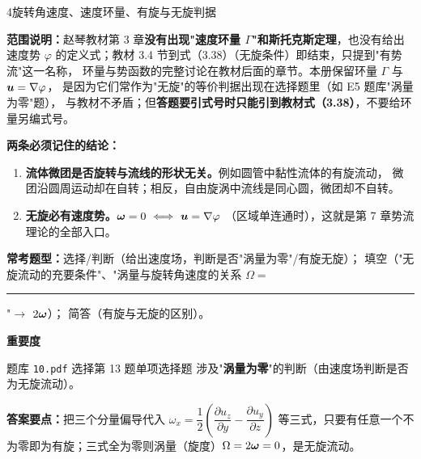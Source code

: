 \begin{kaodian}{4}{旋转角速度、速度环量、有旋与无旋判据}
\begin{tishi}
\textbf{范围说明：}赵琴教材第 3 章\textbf{没有出现"速度环量 $\Gamma$"和斯托克斯定理}，也没有给出
速度势 $\varphi$ 的定义式；教材 3.4 节到式（3.38）（无旋条件）即结束，只提到"有势流"这一名称，
环量与势函数的完整讨论在教材后面的章节。本册保留环量 $\Gamma$ 与 $\bm{u}=\nabla\varphi$，
是因为它们常作为"无旋"的等价判据出现在选择题里（如 E5 题库"涡量为零"题），
与教材不矛盾；但\textbf{答题要引式号时只能引到教材式（3.38）}，不要给环量另编式号。
\end{tishi}

\textbf{两条必须记住的结论：}
\begin{enumerate}[label=(\arabic*),leftmargin=2.1em,itemsep=2pt,topsep=3pt]
\item \textbf{流体微团是否旋转与流线的形状无关。}例如圆管中黏性流体的有旋流动，
微团沿圆周运动却在自转；相反，自由旋涡中流线是同心圆，微团却不自转。
\item \textbf{无旋必有速度势。}$\bomega=0\ \Longleftrightarrow\ \bu=\grad\varphi$
（区域单连通时），这就是第 7 章势流理论的全部入口。
\end{enumerate}

\textbf{常考题型：}选择/判断（给出速度场，判断是否"涡量为零"/有旋无旋）；
填空（"无旋流动的充要条件"、"涡量与旋转角速度的关系 $\Omega=$ \rule{2cm}{0.4pt}"$\to$ $2\bm{\omega}$）；
简答（有旋与无旋的区别）。

\textbf{重要度 }\quad{}\quad{}

\begin{zhenti}{题库 \texttt{10.pdf} 选择第 13 题}{单项选择题}
涉及"\textbf{涡量为零}"的判断（由速度场判断是否为无旋流动）。
\end{zhenti}
\noindent\textbf{答案要点：}把三个分量偏导代入 $\omega_x=\dfrac12\!\left(\dfrac{\partial u_z}{\partial y}-\dfrac{\partial u_y}{\partial z}\right)$
等三式，只要有任意一个不为零即为有旋；三式全为零则涡量（旋度）$\Omega=2\bm{\omega}=0$，是无旋流动。


\end{kaodian}
